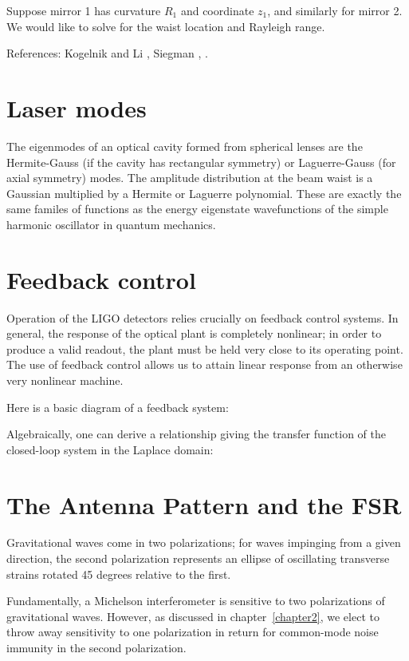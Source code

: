 Suppose mirror 1 has curvature $R_1$ and coordinate $z_1$, and
similarly for mirror 2.  We would like to solve for the waist location
and Rayleigh range.

References: Kogelnik and Li \cite{Kogelnik1966Laser}, Siegman \cite{Siegman1990Lasers}, \cite{Rudiger1998Phase,Fox1961Resonant}.

\section{Laser modes}

The eigenmodes of an optical cavity formed from spherical lenses are
the Hermite-Gauss (if the cavity has rectangular symmetry) or
Laguerre-Gauss (for axial symmetry) modes.  The amplitude distribution
at the beam waist is a Gaussian multiplied by a Hermite or Laguerre
polynomial.  These are exactly the same familes of functions as the
energy eigenstate wavefunctions of the simple harmonic oscillator in
quantum mechanics.

\section{Feedback control}

Operation of the LIGO detectors relies crucially on feedback control
systems.  In general, the response of the optical plant is completely
nonlinear; in order to produce a valid readout, the plant must be held
very close to its operating point.  The use of feedback control allows
us to attain linear response from an otherwise very nonlinear machine.

Here is a basic diagram of a feedback system:

Algebraically, one can derive a relationship giving the transfer function
of the closed-loop system in the Laplace domain:

\section{The Antenna Pattern and the FSR}
\label{sec:antenna-pattern}
Gravitational waves come in two polarizations; for waves impinging
from a given direction, the second polarization represents an ellipse
of oscillating transverse strains rotated 45 degrees relative to the
first.  

Fundamentally, a Michelson interferometer is sensitive to two
polarizations of gravitational waves.  However, as discussed in chapter~\ref{chapter2}, we
elect to throw away sensitivity to one polarization in return for
common-mode noise immunity in the second polarization.

